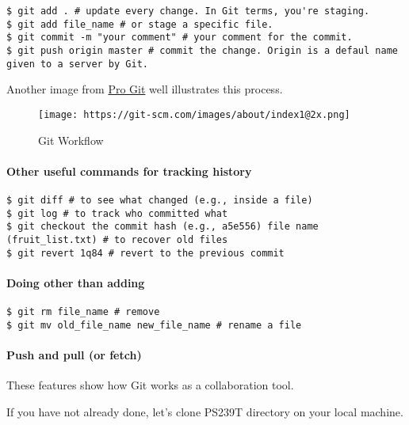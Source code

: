 \documentclass[
]{book}
\begin{document}
\begin{verbatim}
$ git add . # update every change. In Git terms, you're staging. 
$ git add file_name # or stage a specific file.
$ git commit -m "your comment" # your comment for the commit. 
$ git push origin master # commit the change. Origin is a defaul name given to a server by Git. 
\end{verbatim}

Another image from \href{https://git-scm.com/about/staging-area}{Pro Git} well illustrates this process.

\begin{figure}
\centering
\texttt{[image: https://git-scm.com/images/about/index1@2x.png]}
\caption{Git Workflow}
\end{figure}

\hypertarget{other-useful-commands-for-tracking-history}{%
\paragraph{Other useful commands for tracking history}\label{other-useful-commands-for-tracking-history}}

\begin{verbatim}
$ git diff # to see what changed (e.g., inside a file)
$ git log # to track who committed what
$ git checkout the commit hash (e.g., a5e556) file name (fruit_list.txt) # to recover old files 
$ git revert 1q84 # revert to the previous commit 
\end{verbatim}

\hypertarget{doing-other-than-adding}{%
\paragraph{Doing other than adding}\label{doing-other-than-adding}}

\begin{verbatim}
$ git rm file_name # remove 
$ git mv old_file_name new_file_name # rename a file 
\end{verbatim}

\hypertarget{push-and-pull-or-fetch}{%
\paragraph{Push and pull (or fetch)}\label{push-and-pull-or-fetch}}

These features show how Git works as a collaboration tool.

If you have not already done, let's clone PS239T directory on your local machine.
\end{document}
